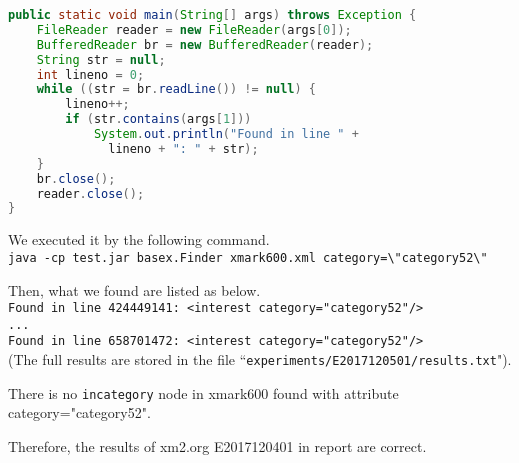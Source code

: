 \begin{lstlisting}[language=java,frame=single]
public static void main(String[] args) throws Exception {
    FileReader reader = new FileReader(args[0]);
    BufferedReader br = new BufferedReader(reader);
    String str = null;
    int lineno = 0;
    while ((str = br.readLine()) != null) {
        lineno++;
        if (str.contains(args[1]))
            System.out.println("Found in line " +
              lineno + ": " + str);
    }
    br.close();
    reader.close();
}
\end{lstlisting}

We executed it by the following command.\\
\verb|java -cp test.jar basex.Finder xmark600.xml category=\"category52\"|

Then, what we found are listed as below.\\
\verb|Found in line 424449141: <interest category="category52"/>|\\
\verb|...|\\
\verb|Found in line 658701472: <interest category="category52"/>|\\
(The full results are stored in the file ``\texttt{experiments/E2017120501/results.txt}"). 

There is no \texttt{incategory} node in xmark600 found with attribute category="category52". 

Therefore, the results of xm2.org E2017120401 in report are correct.


